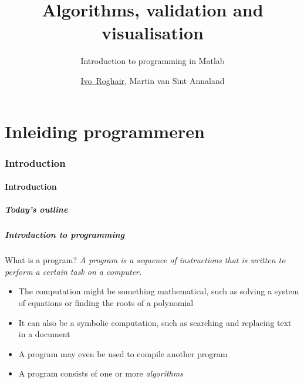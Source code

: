 \documentclass[11pt,table,final,fleqn,xcolor={usenames,dvipsnames},unknownkeysallowed]{beamer}
\title{Algorithms, validation and visualisation}
\subtitle{Introduction to programming in Matlab}
\author[I.~Roghair]{\underline{Ivo~Roghair}, Martin van Sint Annaland}
\institute{Chemical Process Intensification\\Eindhoven University of Technology}
\date
\begin{document}

\part{Inleiding programmeren}
\frame[plain]{
  \titlepage
}


\section{Introduction}
\subsection*{Introduction}
\begin{frame}[label=contents,nonavbar]
  \frametitle{Today's outline}
\end{frame}

\begin{frame}
 \frametitle{Introduction to programming}
 \begin{block}{What is a program?}
  \emph{A program is a sequence of instructions that is written to perform a certain task on a computer.} %
  \end{block}
  \begin{itemize}
    \item The computation might be something mathematical, such as solving a system of equations or finding the roots of a polynomial
    \item It can also be a symbolic computation, such as searching and replacing text in a document 
    \item A program may even be used to compile another program
    \item A program consists of one or more \emph{algorithms}
  \end{itemize}
\end{frame}
\end{document}
